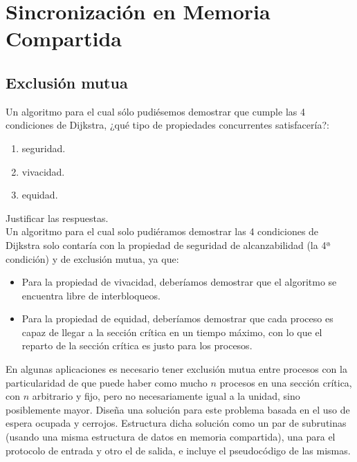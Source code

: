 \section{Sincronización en Memoria Compartida}
\subsection{Exclusión mutua}
\begin{ejercicio}
    Un algoritmo para el cual sólo pudiésemos demostrar que cumple las 4 condiciones de Dijkstra, ¿qué tipo de propiedades concurrentes satisfacería?: 
    \begin{enumerate}[label=(\alph*)]
        \item seguridad.
        \item vivacidad.
        \item equidad.
    \end{enumerate}
    Justificar las respuestas.\\

    Un algoritmo para el cual solo pudiéramos demostrar las 4 condiciones de Dijkstra solo contaría con la propiedad de seguridad de alcanzabilidad (la 4ª condición) y de exclusión mutua, ya que:
    \begin{itemize}
        \item Para la propiedad de vivacidad, deberíamos demostrar que el algoritmo se encuentra libre de interbloqueos.
        \item Para la propiedad de equidad, deberíamos demostrar que cada proceso es capaz de llegar a la sección crítica en un tiempo máximo, con lo que el reparto de la sección crítica es justo para los procesos.
    \end{itemize}
\end{ejercicio}

\begin{ejercicio} %
    En algunas aplicaciones es necesario tener exclusión mutua entre procesos con la particularidad de que puede haber como mucho $n$ procesos en una sección crítica, con $n$ arbitrario y fijo, pero no necesariamente igual a la unidad, sino posiblemente mayor. Diseña una solución para este problema basada en el uso de espera ocupada y cerrojos. Estructura dicha solución como un par de subrutinas (usando una misma estructura de datos en memoria compartida), una para el protocolo de entrada y otro el de salida, e incluye el pseudocódigo de las mismas.
\end{ejercicio}

